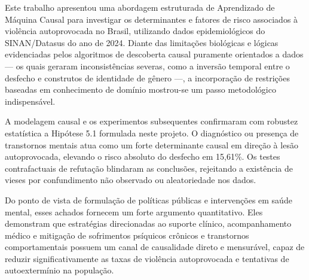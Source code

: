 Este trabalho apresentou uma abordagem estruturada de Aprendizado de Máquina Causal para investigar os determinantes e fatores de risco associados à violência autoprovocada no Brasil, utilizando dados epidemiológicos do SINAN/Datasus do ano de 2024. Diante das limitações biológicas e lógicas evidenciadas pelos algoritmos de descoberta causal puramente orientados a dados — os quais geraram inconsistências severas, como a inversão temporal entre o desfecho e construtos de identidade de gênero —, a incorporação de restrições baseadas em conhecimento de domínio mostrou-se um passo metodológico indispensável.

A modelagem causal e os experimentos subsequentes confirmaram com robustez estatística a Hipótese 5.1 formulada neste projeto. O diagnóstico ou presença de transtornos mentais atua como um forte determinante causal em direção à lesão autoprovocada, elevando o risco absoluto do desfecho em 15,61\%. Os testes contrafactuais de refutação blindaram as conclusões, rejeitando a existência de vieses por confundimento não observado ou aleatoriedade nos dados.

Do ponto de vista de formulação de políticas públicas e intervenções em saúde mental, esses achados fornecem um forte argumento quantitativo. Eles demonstram que estratégias direcionadas ao suporte clínico, acompanhamento médico e mitigação de sofrimentos psíquicos crônicos e transtornos comportamentais possuem um canal de causalidade direto e mensurável, capaz de reduzir significativamente as taxas de violência autoprovocada e tentativas de autoextermínio na população.
